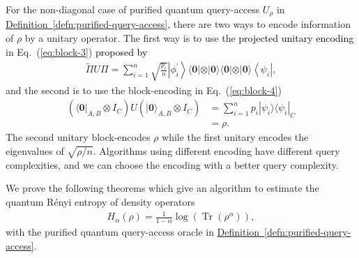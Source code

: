 \documentclass[journal]{IEEEtran}
\newcommand{\eq}[1]{Eq.~(\ref{eq:#1})}
\newcommand{\defn}[1]{\hyperref[defn:#1]{Definition~\ref*{defn:#1}}}
\def\Tr{\operatorname{Tr}}\def\atanh{\operatorname{atanh}}\def\:{\hbox{\bf:}}
\begin{document}
For the non-diagonal case of purified quantum query-access $U_{\rho}$ in \defn{purified-query-access}, there are two ways to encode information of $\rho$ by a unitary operator. The first way is to use the \textcolor{black}{projected unitary encoding} in \eq{block-3} \textcolor{black}{proposed by \cite{gilyen2019distributional}}
\begin{align}
  \label{eq:block-encoding-rho-1}
  \widetilde{\Pi}U\Pi=\sum_{i=1}^n \sqrt{\frac{p_i}{n}}\left|\phi_i^{\prime}\right\rangle\langle \mathbf{0}|\otimes| \mathbf{0}\rangle\langle \mathbf{0}|\otimes| \mathbf{0}\rangle\left\langle\psi_i\right|,
\end{align}
and the second is to use the block-encoding in \eq{block-4}
\begin{align}
  \label{eq:block-encoding-rho-2}
  (\langle\mathbf{0}|_{A,B}\otimes I_C)U(|\mathbf{0}\rangle_{A,B}\otimes I_C) &= \sum_{i=1}^n p_i|\psi_i\rangle\langle \psi_i|_C \nonumber\\&= \rho.
\end{align}
The second unitary block-encodes $\rho$ while the first unitary encodes the eigenvalues of $\sqrt{\rho/n}$. Algorithms using different encoding have different query complexities, and we can choose the encoding with a better query complexity. 

We prove the following theorems which give an algorithm to estimate the quantum R{\'e}nyi entropy of density operators 
\begin{align}
    H_{\alpha}(\rho) = \frac{1}{1-\alpha}\log(\Tr(\rho^{\alpha})),
\end{align}
with the purified quantum query-access oracle in \defn{purified-query-access}. 
\end{document}

